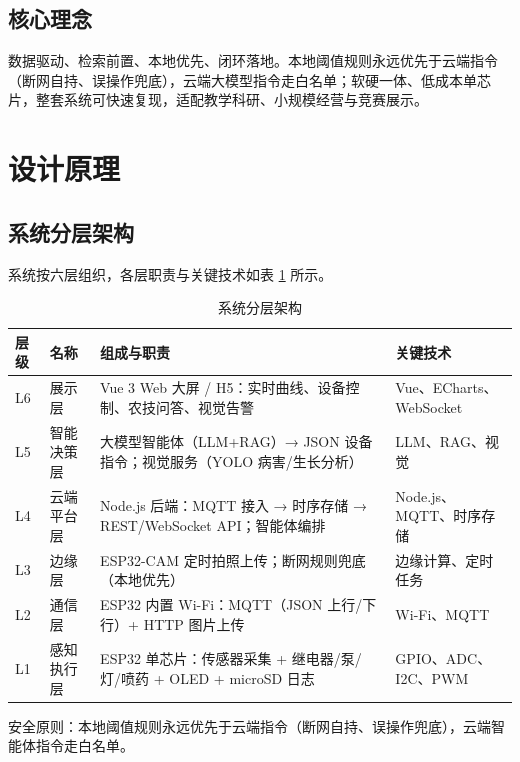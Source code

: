 ﻿\documentclass[11pt]{ctexart}
\begin{document}
\subsection{核心理念}
数据驱动、检索前置、本地优先、闭环落地。本地阈值规则永远优先于云端指令（断网自持、误操作兜底），云端大模型指令走白名单；软硬一体、低成本单芯片，整套系统可快速复现，适配教学科研、小规模经营与竞赛展示。

\section{设计原理}
\subsection{系统分层架构}
系统按六层组织，各层职责与关键技术如表 \ref{tab:layers} 所示。
\begin{longtable}{p{1.2cm}p{2.2cm}p{8.8cm}p{3.0cm}}
  \caption{系统分层架构}\label{tab:layers}\\
  \toprule
  层级 & 名称 & 组成与职责 & 关键技术 \\
  \midrule
  L6 & 展示层 & Vue 3 Web 大屏 / H5：实时曲线、设备控制、农技问答、视觉告警 & Vue、ECharts、WebSocket \\
  L5 & 智能决策层 & 大模型智能体（LLM+RAG）→ JSON 设备指令；视觉服务（YOLO 病害/生长分析） & LLM、RAG、视觉 \\
  L4 & 云端平台层 & Node.js 后端：MQTT 接入 → 时序存储 → REST/WebSocket API；智能体编排 & Node.js、MQTT、时序存储 \\
  L3 & 边缘层 & ESP32-CAM 定时拍照上传；断网规则兜底（本地优先） & 边缘计算、定时任务 \\
  L2 & 通信层 & ESP32 内置 Wi-Fi：MQTT（JSON 上行/下行）+ HTTP 图片上传 & Wi-Fi、MQTT \\
  L1 & 感知执行层 & ESP32 单芯片：传感器采集 + 继电器/泵/灯/喷药 + OLED + microSD 日志 & GPIO、ADC、I2C、PWM \\
  \bottomrule
\end{longtable}
安全原则：本地阈值规则永远优先于云端指令（断网自持、误操作兜底），云端智能体指令走白名单。
\end{document}
